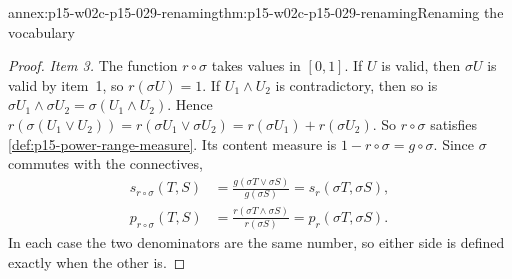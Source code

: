 \begin{annexitem}{annex:p15-w02c-p15-029-renaming}{thm:p15-w02c-p15-029-renaming}{Renaming the vocabulary}
\begin{proof}
\emph{Item 3.} The function \(r\circ\sigma\) takes values in \([0,1]\).
If \(U\) is valid, then \(\sigma U\) is valid by item~1, so
\(r(\sigma U)=1\). If \(U_1\land U_2\) is contradictory, then so is
\(\sigma U_1\land\sigma U_2=\sigma(U_1\land U_2)\). Hence
\(r(\sigma(U_1\lor U_2))=r(\sigma U_1\lor\sigma U_2)
=r(\sigma U_1)+r(\sigma U_2)\). So \(r\circ\sigma\) satisfies
\cref{def:p15-power-range-measure}. Its content measure is
\(1-r\circ\sigma=g\circ\sigma\). Since \(\sigma\) commutes with the
connectives,
\[
\begin{aligned}
 s_{r\circ\sigma}(T,S)&=\frac{g(\sigma T\lor\sigma S)}{g(\sigma S)}
 =s_r(\sigma T,\sigma S),\\[2pt]
 p_{r\circ\sigma}(T,S)&=\frac{r(\sigma T\land\sigma S)}{r(\sigma S)}
 =p_r(\sigma T,\sigma S).
\end{aligned}
\]
In each case the two denominators are the same number, so either side is
defined exactly when the other is.
\end{proof}
\end{annexitem}

